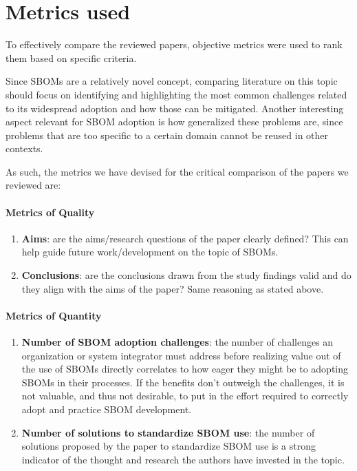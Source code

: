 \section{Metrics used} \label{metrics}

To effectively compare the reviewed papers, objective metrics were used to rank them based on specific criteria.

Since SBOMs are a relatively novel concept, comparing literature on this topic should focus on identifying and highlighting the most common challenges related to its widespread adoption and how those can be mitigated. Another interesting aspect relevant for SBOM adoption is how generalized these problems are, since problems that are too specific to a certain domain cannot be reused in other contexts.

As such, the metrics we have devised for the critical comparison of the papers we reviewed are:

\paragraph{Metrics of Quality}
\begin{enumerate}
    \item \textbf{Aims}: are the aims/research questions of the paper clearly defined? This can help guide future work/development on the topic of SBOMs.
    \item \textbf{Conclusions}: are the conclusions drawn from the study findings valid and do they align with the aims of the paper? Same reasoning as stated above.

    \setcounter{metrics}{\value{enumi}}
\end{enumerate}

\paragraph{Metrics of Quantity}
\begin{enumerate}
    \setcounter{enumi}{\value{metrics}}

    \item \textbf{Number of SBOM adoption challenges}: the number of challenges an organization or system integrator must address before realizing value out of the use of SBOMs directly correlates to how eager they might be to adopting SBOMs in their processes. If the benefits don't outweigh the challenges, it is not valuable, and thus not desirable, to put in the effort required to correctly adopt and practice SBOM development.
    \item \textbf{Number of solutions to standardize SBOM use}: the number of solutions proposed by the paper to standardize SBOM use is a strong indicator of the thought and research the authors have invested in the topic.

    \setcounter{metrics}{\value{enumi}}
\end{enumerate}

